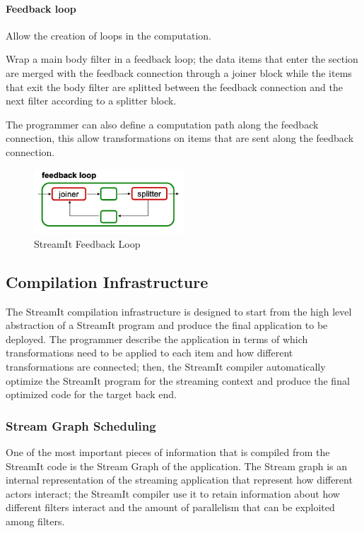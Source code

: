 \documentclass[../main.tex]{subfiles}
\begin{document}
\paragraph{Feedback loop}
Allow the creation of loops in the computation.

Wrap a main body filter in a feedback loop; the data items that enter the section are merged with the feedback connection through a joiner block while the items that exit the body filter are splitted between the feedback connection and the next filter according to a splitter block. 

The programmer can also define a computation path along the feedback connection, this allow transformations on items that are sent along the feedback connection.

\begin{figure}[h!]
  \includegraphics[width=0.5\textwidth]{images/StreamItFeedbackLoop.png}
  \centering
  \caption{StreamIt Feedback Loop}
  \label{fig:feedback}
\end{figure}

\subsection{Compilation Infrastructure}
The StreamIt compilation infrastructure \cite{streamit4} is designed to start from the high level abstraction of a StreamIt program and produce the final application to be deployed. 
The programmer describe the application in terms of which transformations need to be applied to each item and how different transformations are connected; then, the StreamIt compiler automatically optimize the StreamIt program for the streaming context and produce the final optimized code for the target back end.

\subsubsection{Stream Graph Scheduling}
One of the most important pieces of information that is compiled from the StreamIt code is the Stream Graph of the application. The Stream graph is an internal representation of the streaming application that represent how different actors interact; the StreamIt compiler use it to retain information about how different filters interact and the amount of parallelism that can be exploited among filters.
\end{document}
